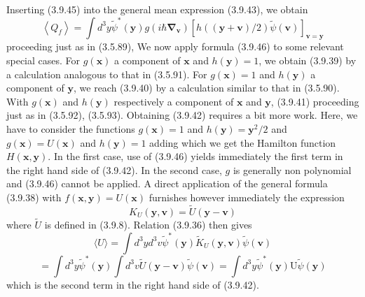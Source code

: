 \documentclass{article}
\begin{document}
Inserting (3.9.45) into the general mean expression (3.9.43), we obtain
$$
\begin{equation*}
\left\langle Q_{f}\right\rangle=\int d^{3} y \tilde{\psi}^{*}(\boldsymbol{y}) g\left(i \hbar \boldsymbol{\nabla}_{\boldsymbol{v}}\right)[h((\boldsymbol{y}+\boldsymbol{v}) / 2) \tilde{\psi}(\boldsymbol{v})]_{\boldsymbol{v}=\boldsymbol{y}} \tag{3.9.46}
\end{equation*}
$$
proceeding just as in (3.5.89),
We now apply formula (3.9.46) to some relevant special cases. For $g(\boldsymbol{x})$ a component of $\boldsymbol{x}$ and $h(\boldsymbol{y})=1$, we obtain (3.9.39) by a calculation analogous to that in (3.5.91). For $g(\boldsymbol{x})=1$ and $h(\boldsymbol{y})$ a component of $\boldsymbol{y}$, we reach (3.9.40) by a calculation similar to that in (3.5.90). With $g(\boldsymbol{x})$ and $h(\boldsymbol{y})$ respectively a component of $\boldsymbol{x}$ and $\boldsymbol{y}$, (3.9.41) proceeding just as in (3.5.92), (3.5.93). Obtaining (3.9.42) requires a bit more work. Here, we have to consider the functions $g(\boldsymbol{x})=1$ and $h(\boldsymbol{y})=\boldsymbol{y}^{2} / 2$ and $g(\boldsymbol{x})=U(\boldsymbol{x})$ and $h(\boldsymbol{y})=1$ adding which we get the Hamilton function $H(\boldsymbol{x}, \boldsymbol{y})$. In the first case, use of (3.9.46) yields immediately the first term in the right hand side of (3.9.42). In the second case, $g$ is generally non polynomial and (3.9.46) cannot be applied. A direct application of the general formula (3.9.38) with $f(\boldsymbol{x}, \boldsymbol{y})=U(\boldsymbol{x})$ furnishes however immediately the expression
$$
\begin{equation*}
K_{U}(\boldsymbol{y}, \boldsymbol{v})=\tilde{U}(\boldsymbol{y}-\boldsymbol{v}) \tag{3.9.47}
\end{equation*}
$$
where $\tilde{U}$ is defined in (3.9.8). Relation (3.9.36) then gives
$$
\begin{equation*}
\langle U\rangle=\int d^{3} y d^{3} v \tilde{\psi}^{*}(\boldsymbol{y}) \tilde{K}_{U}(\boldsymbol{y}, \boldsymbol{v}) \tilde{\psi}(\boldsymbol{v}) \tag{3.9.48}
\end{equation*}
$$
$$
=\int d^{3} y \tilde{\psi}^{*}(\boldsymbol{y}) \int d^{3} v \tilde{U}(\boldsymbol{y}-\boldsymbol{v}) \tilde{\psi}(\boldsymbol{v})=\int d^{3} y \tilde{\psi}^{*}(\boldsymbol{y}) \mathrm{U} \tilde{\psi}(\boldsymbol{y})
$$
which is the second term in the right hand side of (3.9.42).
\end{document}
